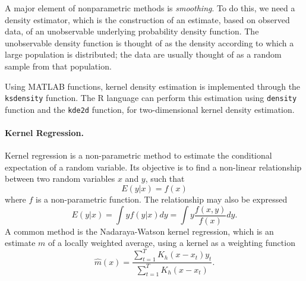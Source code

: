 A major element of nonparametric methods is \emph{smoothing}. To do this, we need a density estimator, which is the construction of an estimate, based on observed data, of an unobservable underlying probability density function. The unobservable density function is thought of as the density according to which a large population is distributed; the data are usually thought of as a random sample from that population.

Using MATLAB functions, kernel density estimation is implemented through the \texttt{ksdensity} function. The R language can perform this estimation using \texttt{density} function and the \texttt{kde2d} function, for two-dimensional kernel density estimation.

\paragraph{Kernel Regression.} Kernel regression is a non-parametric method to estimate the conditional expectation of a random variable. Its objective is to find a non-linear relationship between two random variables $x$ and $y$, such that
\[
E(y | x) = f(x)
\]
where $f$ is a non-parametric function. The relationship may also be expressed
\[
E(y | x) = \int y f(y|x) dy = \int y \frac{f(x,y)}{f(x)} dy.
\]
A common method is the Nadaraya-Watson kernel regression, which is an estimate $m$ of a locally weighted average, using a kernel as a weighting function
\[
\widehat{m}(x)=\frac{\sum_{t=1}^T K_h(x-x_t)y_t }{\sum_{t=1}^T K_h(x-x_t)}.
\]

